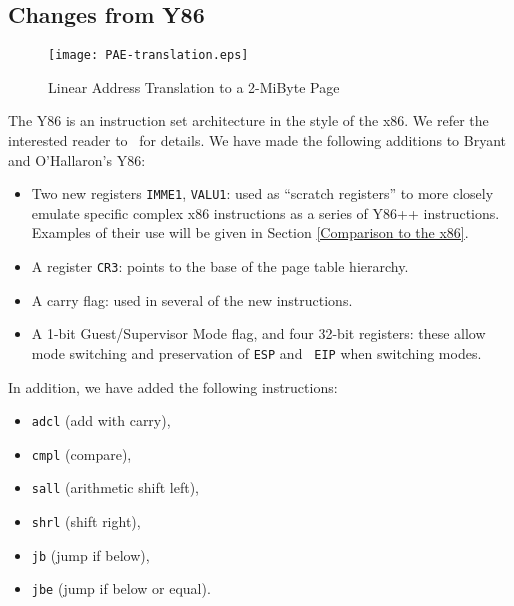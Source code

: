 \documentclass[submission,copyright]{eptcs} \providecommand{\event}{ACL2 2011}
\begin{document}
\subsection{Changes from Y86}
\label{Changes from Y86}



\begin{figure}
\begin{center}
\texttt{[image: PAE-translation.eps]}
\end{center}

\caption{\label{address-translation} Linear Address Translation to a 2-MiByte Page}
\end{figure}

The Y86 is an instruction set architecture in the style of
the x86.  We refer the interested reader to~\cite{BryantOHallaron} for
details.  We have made the following additions to Bryant
and O'Hallaron's Y86:

\begin{itemize}
\item Two new registers {\tt IMME1}, {\tt VALU1}: used as ``scratch
  registers'' to more closely emulate specific complex x86
  instructions as a series of Y86++ instructions.  Examples of their
  use will be given in Section \ref{Comparison to the x86}.

\item A register {\tt CR3}: points to the base of the page table
  hierarchy.

\item A carry flag:  used in several of the new instructions. 

\item A 1-bit Guest/Supervisor Mode flag, and four 32-bit registers:
  these allow mode switching and preservation of {\tt ESP} and {\tt
    EIP} when switching modes.
\end{itemize}
In addition, we have added the following instructions: 
\begin{itemize}
\item {\tt adcl} (add with carry), 
\item {\tt cmpl} (compare), 
\item {\tt sall} (arithmetic shift left),
\item {\tt shrl} (shift right), 
\item {\tt jb} (jump if below), 
\item {\tt jbe} (jump if below or equal).  
\end{itemize}
\end{document}
